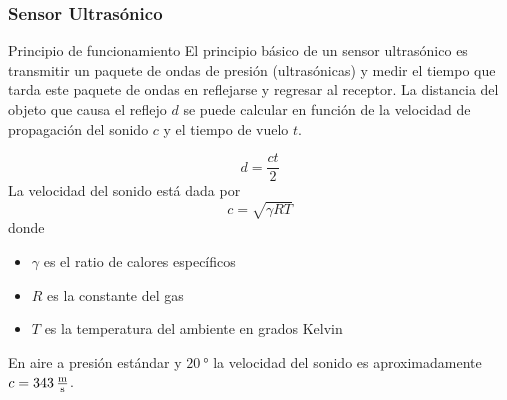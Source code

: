 \begin{frame}
    \frametitle{Sensor Ultrasónico}
    \small
    \begin{block}{Principio de funcionamiento}
        El principio básico de un sensor ultrasónico es transmitir un paquete de ondas de presión (ultrasónicas) y medir el tiempo que tarda este paquete de ondas en reflejarse y regresar al receptor. La distancia del objeto que causa el reflejo  $d$ se puede calcular en función de la velocidad de propagación del sonido $c$ y el tiempo de vuelo $t$.
   
        \begin{equation*}
            d = \dfrac{c t}{2}
        \end{equation*}
        La velocidad del sonido está dada por
        \begin{equation*}
            c = \sqrt{\gamma R T}
        \end{equation*}
        donde
        \begin{itemize}
            \item $\gamma$ es el ratio de calores específicos\\
            \item $R$ es la constante del gas\\
            \item $T$ es la temperatura del ambiente en grados Kelvin
        \end{itemize}
            
        En aire a presión estándar y $\SI{20}{\degree}$ la velocidad del sonido es aproximadamente $c = \SI{343}{\meter\over\second}$.
    \end{block}
\end{frame}